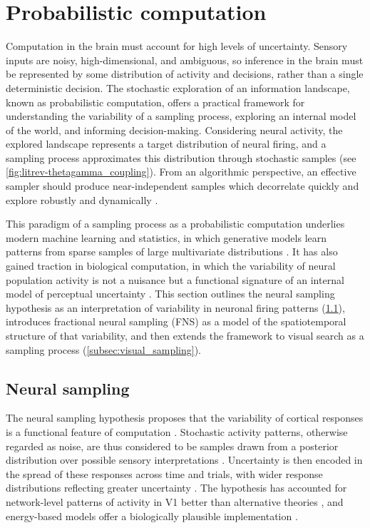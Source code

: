 \section{Probabilistic computation}\label{sec:comp_sampling}
Computation in the brain must account for high levels of uncertainty. Sensory inputs are noisy, high-dimensional, and ambiguous, so inference in the brain must be represented by some distribution of activity and decisions, rather than a single deterministic decision. The stochastic exploration of an information landscape, known as probabilistic computation, offers a practical framework for understanding the variability of a sampling process, exploring an internal model of the world, and informing decision-making. Considering neural activity, the explored landscape represents a target distribution of neural firing, and a sampling process approximates this distribution through stochastic samples (see \cref{fig:litrev-thetagamma_coupling}). From an algorithmic perspective, an effective sampler should produce near-independent samples which decorrelate quickly and explore robustly and dynamically \cite{delacour_neural_1997, dong_neural_nodate}.

This paradigm of a sampling process as a probabilistic computation underlies modern machine learning and statistics, in which generative models learn patterns from sparse samples of large multivariate distributions \cite{delacour_neural_1997, cranmer_advances_2023}. It has also gained traction in biological computation, in which the variability of neural population activity is not a nuisance but a functional signature of an internal model of perceptual uncertainty \cite{terada_chaotic_2024, koch_predicting_1999, lange_bayesian_2020}. This section outlines the neural sampling hypothesis as an interpretation of variability in neuronal firing patterns (\cref{subsec:neur_sampling}), introduces fractional neural sampling (FNS) as a model of the spatiotemporal structure of that variability, and then extends the framework to visual search as a sampling process (\cref{subsec:visual_sampling}).

\subsection{Neural sampling}\label{subsec:neur_sampling}
The neural sampling hypothesis proposes that the variability of cortical responses is a functional feature of computation \cite{orban_neural_2016}. Stochastic activity patterns, otherwise regarded as noise, are thus considered to be samples drawn from a posterior distribution over possible sensory interpretations \cite{orban_neural_2016, NIPS2002_a486cd07}. Uncertainty is then encoded in the spread of these responses across time and trials, with wider response distributions reflecting greater uncertainty \cite{NIPS2002_a486cd07, delacour_neural_1997, orban_neural_2016}. The hypothesis has accounted for network-level patterns of activity in V1 better than alternative theories \cite{NIPS2002_a486cd07, ujfalussy_sampling_2022, orban_neural_2016}, and energy-based models offer a biologically plausible implementation \cite{dong_neural_nodate}.

